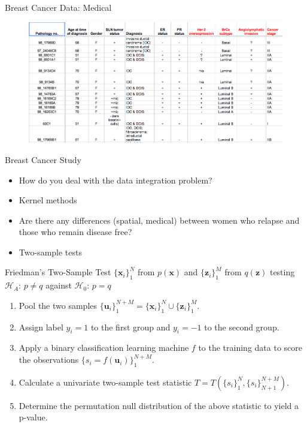 \documentclass{beamer}
\begin{document}
\begin{frame}{Breast Cancer Data: Medical}
  \begin{figure}
    \centering
    \includegraphics[scale=.5]{medical.png}
  \end{figure}
\end{frame}

\begin{frame}{Breast Cancer Study}
  \begin{itemize}
  \item How do you deal with the data integration problem? \pause
  \item Kernel methods \pause
  \item Are there any differences (spatial, medical) between women who
    relapse and those who remain disease free? \pause
  \item Two-sample tests
  \end{itemize}
\end{frame}

\begin{frame}{Friedman's Two-Sample Test}
  $\{\mathbf{x}_i\}_1^N$ from $p(\mathbf{x})$ and
  $\{\mathbf{z}_i\}_1^M$ from $q(\mathbf{z})$ testing \\
  $\mathcal{H}_A$: $p \neq q$ against $\mathcal{H}_0$: $p = q$ \pause
  \begin{enumerate}
  \item Pool the two samples $\{\mathbf{u}_i\}_1^{N+M} =
    \{\mathbf{x}_i\}_1^{N} \cup \{\mathbf{z}_i\}_1^{M}$. \pause
  \item Assign label $y_i = 1$ to the first group and $y_i = -1$ to
    the second group. \pause
  \item Apply a binary classification learning machine $f$ to the training
    data to score the observations $\{s_i = f(\mathbf{u}_i)\}_1^{N+M}$. \pause
  \item Calculate a univariate two-sample test statistic
    $T = T(\{s_i\}_1^N,\{s_i\}_{N+1}^{N+M})$. \pause
  \item Determine the permutation null distribution of the above
    statistic to yield a p-value.
  \end{enumerate}
\end{frame}
\end{document}
